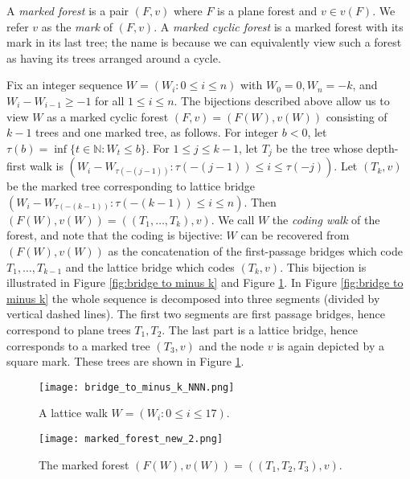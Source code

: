 
A {\em marked forest} is a pair $(F, v)$ where $F$ is a plane forest and $v\in v(F)$. We refer $v$ as the {\em mark} of $(F,v)$. A {\em marked cyclic forest} is a marked forest with its mark in its last tree; the name is because we can equivalently view such a forest as having its trees arranged around a cycle.

Fix an integer sequence $W=(W_i:0\le i\le n)$ with $W_0=0, W_n=-k$, and $W_i-W_{i-1}\ge -1$ for all $1\le i\le n$. 
The bijections described above allow us to view $W$ as a marked cyclic forest $(F,v)=(F(W),v(W))$ consisting of $k-1$ trees and one marked tree, as follows. For integer $b<0$, let $\tau(b)=\inf\{t\in\mathbb{N}: W_t\le b\}$. For $1\le j\le k-1$, let $T_j$ be the tree whose depth-first walk is $(W_i-W_{\tau(-(j-1))}: \tau(-(j-1))\le i\le \tau(-j))$.  Let $(T_k,v)$ be the marked tree corresponding to lattice bridge $(W_i-W_{\tau(-(k-1))}: \tau(-(k-1))\le i\le n)$.  Then $(F(W),v(W))=((T_1,\ldots,T_k),v)$.  We call $W$ the {\em coding walk} of the forest, and note that the coding is bijective: $W$ can be recovered from $(F(W),v(W))$ as the concatenation of the first-passage bridges which code $T_1,\ldots,T_{k-1}$ and the lattice bridge which codes $(T_k,v)$. This bijection is illustrated in Figure \ref{fig:bridge to minus k} and Figure \ref{fig:marked forest}. In Figure \ref{fig:bridge to minus k} the whole sequence is decomposed into three segments (divided by vertical dashed lines). The first two segments are first passage bridges, hence correspond to plane trees $T_1, T_2$. The last part is a lattice bridge, hence corresponds to a marked tree $(T_3, v)$ and the node $v$ is again depicted by a square mark. These trees are shown in Figure \ref{fig:marked forest}. 

\begin{figure}[h]
\centering
\begin{minipage}{\textwidth}
\centering
\texttt{[image: bridge\_to\_minus\_k\_NNN.png]}
\caption{A lattice walk $W=(W_i: 0\le i\le 17)$.}
\label{fig:bridge to minus k}
\end{minipage}\vfill
\begin{minipage}{\textwidth}
\centering
\texttt{[image: marked\_forest\_new\_2.png]}
\caption{The marked forest $(F(W),v(W))=((T_1, T_2, T_3), v)$.}
\label{fig:marked forest}
\end{minipage}
\end{figure}

